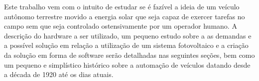 Este trabalho vem com o intuito de estudar se é fazível a ideia de um veículo autônomo terrestre movido a energia solar que seja capaz de exercer tarefas no campo sem que seja controlado ostensivamente por um operador humano. A descrição do hardware a ser utilizado, um pequeno estudo sobre a as demandas e a possível solução em relação a utilização de um sistema fotovoltaico e a criação da solução em forma de software serão detalhadas nas seguintes seções, bem como um pequeno e simplístico histórico sobre a automação de veículos datando desde a década de 1920 até os dias atuais.
